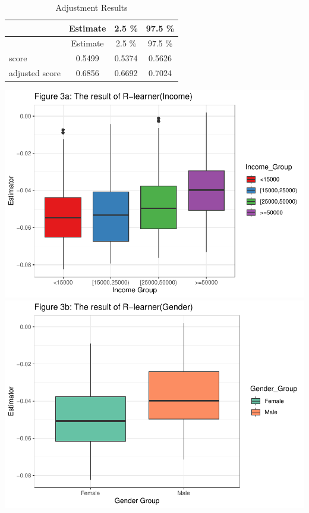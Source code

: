 \documentclass[
  12pt,
]{article}
\begin{document}
\begin{longtable}[]{@{}lccc@{}}
\caption{Adjustment Results}\tabularnewline
\toprule()
& Estimate & 2.5 \% & 97.5 \% \\
\midrule()
\endfirsthead
\toprule()
& Estimate & 2.5 \% & 97.5 \% \\
\midrule()
\endhead
score & 0.5499 & 0.5374 & 0.5626 \\
adjusted score & 0.6856 & 0.6692 & 0.7024 \\
\bottomrule()
\end{longtable}

\includegraphics{template_files/figure-latex/unnamed-chunk-8-1.pdf}
\includegraphics{template_files/figure-latex/unnamed-chunk-8-2.pdf}
\end{document}
